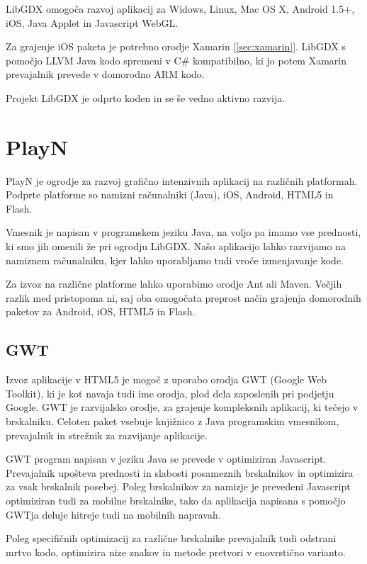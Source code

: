 LibGDX omogoča razvoj aplikacij za Widows, Linux, Mac OS X, Android 1.5+, iOS, Java Applet in Javascript WebGL. 

Za grajenje iOS paketa je potrebno orodje Xamarin [\ref{sec:xamarin}]. LibGDX s pomočjo LLVM Java kodo spremeni v C\# kompatibilno, ki jo potem Xamarin prevajalnik prevede v domorodno ARM kodo.

Projekt LibGDX je odprto koden in se še vedno aktivno razvija.

\section{PlayN}
\label{sec:playn}
PlayN \cite{playn} je ogrodje za razvoj grafično intenzivnih aplikacij na različnih platformah. Podprte platforme so namizni računalniki (Java), iOS, Android, HTML5 in Flash.

Vmesnik je napisan v programskem jeziku Java, na voljo pa imamo vse prednosti, ki smo jih omenili že pri ogrodju LibGDX. Našo aplikacijo lahko razvijamo na namiznem računalniku, kjer lahko uporabljamo tudi vroče izmenjavanje kode. 

Za izvoz na različne platforme lahko uporabimo orodje Ant ali Maven. Večjih razlik med pristopoma ni, saj oba omogočata preprost način grajenja domorodnih paketov za Android, iOS, HTML5 in Flash.

\subsection{GWT}

Izvoz aplikacije v HTML5 je mogoč z uporabo orodja GWT (Google Web Toolkit), ki je kot navaja tudi ime orodja, plod dela zaposlenih pri podjetju Google. GWT je razvijalsko orodje, za grajenje kompleksnih aplikacij, ki tečejo v brskalniku. Celoten paket vsebuje knjižnico z Java programskim vmesnikom, prevajalnik in strežnik za razvijanje aplikacije.

GWT program napisan v jeziku Java se prevede v optimiziran Javascript. Prevajalnik upošteva prednosti in slabosti posameznih brskalnikov in optimizira za vsak brskalnik posebej. Poleg brskalnikov za namizje je prevedeni Javascript optimiziran tudi za mobilne brskalnike, tako da aplikacija napisana s pomočjo GWTja deluje hitreje tudi na mobilnih napravah.

Poleg specifičnih optimizacij za različne brskalnike prevajalnik tudi odstrani mrtvo kodo, optimizira nize znakov in metode pretvori v enovrstično varianto.

